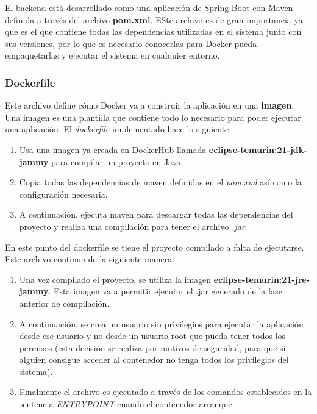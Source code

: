 El backend está desarrollado como una aplicación de Spring Boot con Maven definida a través del archivo \textbf{pom.xml}. ESte archivo es de gran importancia ya que es el que
contiene todas las dependencias utilizadas en el sistema junto con sus versiones, por lo que es necesario conocerlas para Docker pueda empaquetarlas y ejecutar el sistema en 
cualquier entorno.

\subsubsection{Dockerfile}

Este archivo define cómo Docker va a construir la aplicación en una \textbf{imagen}. Una imagen es una plantilla que contiene todo lo necesario para poder ejecutar una
aplicación. El \textit{dockerfile} implementado hace lo siguiente:

\begin{enumerate}
    \item Usa una imagen ya creada en DockerHub llamada \textbf{eclipse-temurin:21-jdk-jammy} para compilar un proyecto en Java.
    \item Copia todas las dependencias de maven definidas en el \textit{pom.xml}  así como la configuración necesaria.
    \item A continuación, ejecuta maven para descargar todas las dependencias del proyecto y realiza una compilación para tener el archivo \textit{.jar}.
\end{enumerate}

En este punto del dockerfile se tiene el proyecto compilado a falta de ejecutarse. Este archivo continua de la siguiente manera:

\begin{enumerate}
    \item Una vez compilado el proyecto, se utiliza la imagen \textbf{eclipse-temurin:21-jre-jammy}. Esta imagen va a permitir ejecutar el .jar generado de la fase anterior de
    compilación.

    \item A continuación, se crea un usuario sin privilegios para ejecutar la aplicación desde ese usuario y no desde un usuario root que pueda tener todos los permisos (esta decisión
    se realiza por motivos de seguridad, para que si alguien consigue acceder al contenedor no tenga todos los privilegios del sistema).

    \item Finalmente el archivo es ejecutado a través de los comandos establecidos en la sentencia \textit{ENTRYPOINT} cuando el contenedor arranque.
\end{enumerate}

